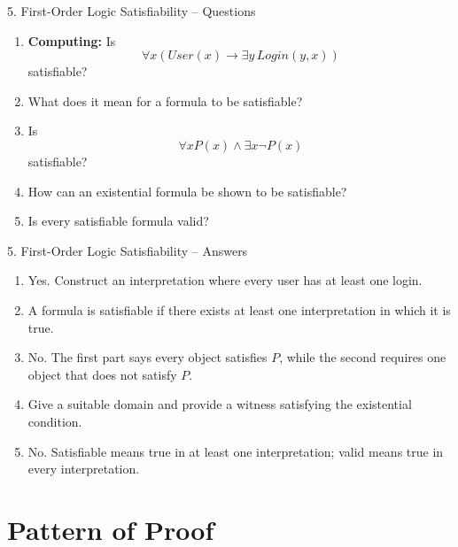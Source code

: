 \documentclass[aspectratio=169,11pt]{beamer}
\begin{document}
\begin{frame}{5. First-Order Logic Satisfiability -- Questions}

\begin{enumerate}
\item \textbf{Computing:} Is
\[
\forall x(User(x)\to\exists y\,Login(y,x))
\]
satisfiable?

\item What does it mean for a formula to be satisfiable?

\item Is
\[
\forall xP(x)\land\exists x\neg P(x)
\]
satisfiable?

\item How can an existential formula be shown to be satisfiable?

\item Is every satisfiable formula valid?
\end{enumerate}

\end{frame}

\begin{frame}{5. First-Order Logic Satisfiability -- Answers}

\begin{enumerate}
\item Yes. Construct an interpretation where every user has at least one login.

\item A formula is satisfiable if there exists at least one interpretation in which it is true.

\item No. The first part says every object satisfies $P$, while the second requires one object that does not satisfy $P$.

\item Give a suitable domain and provide a witness satisfying the existential condition.

\item No. Satisfiable means true in at least one interpretation; valid means true in every interpretation.
\end{enumerate}

\end{frame}


\section{Pattern of Proof}
\end{document}
